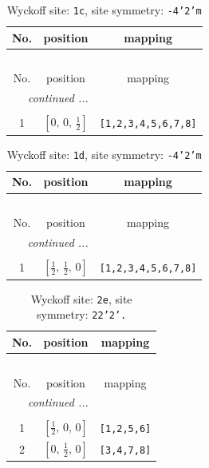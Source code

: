 \documentclass[fleqn,8pt]{jsarticle}
\begin{document}
\begin{longtable}{ccc}
\caption{Wyckoff site: {\tt 1c}, site symmetry: {\tt -4'2'm}}
 \\
 \hline \hline
No. & position & mapping \\ \hline \endfirsthead

\multicolumn{2}{l}{\tablename\ \thetable{}} \\
 \hline \hline
No. & position & mapping \\ \hline \endhead

 \hline \hline
\multicolumn{2}{r}{\footnotesize\it continued ...} \\ \endfoot

 \hline \hline
\multicolumn{2}{r}{} \\ \endlastfoot

1 & $\left[ 0,\, 0,\, \frac{1}{2} \right]$ & {\tt [1,2,3,4,5,6,7,8]} \\
\end{longtable}
\renewcommand{\arraystretch}{1.2}
\begin{longtable}{ccc}
\caption{Wyckoff site: {\tt 1d}, site symmetry: {\tt -4'2'm}}
 \\
 \hline \hline
No. & position & mapping \\ \hline \endfirsthead

\multicolumn{2}{l}{\tablename\ \thetable{}} \\
 \hline \hline
No. & position & mapping \\ \hline \endhead

 \hline \hline
\multicolumn{2}{r}{\footnotesize\it continued ...} \\ \endfoot

 \hline \hline
\multicolumn{2}{r}{} \\ \endlastfoot

1 & $\left[ \frac{1}{2},\, \frac{1}{2},\, 0 \right]$ & {\tt [1,2,3,4,5,6,7,8]} \\
\end{longtable}
\renewcommand{\arraystretch}{1.2}
\begin{longtable}{ccc}
\caption{Wyckoff site: {\tt 2e}, site symmetry: {\tt 22'2'.}}
 \\
 \hline \hline
No. & position & mapping \\ \hline \endfirsthead

\multicolumn{2}{l}{\tablename\ \thetable{}} \\
 \hline \hline
No. & position & mapping \\ \hline \endhead

 \hline \hline
\multicolumn{2}{r}{\footnotesize\it continued ...} \\ \endfoot

 \hline \hline
\multicolumn{2}{r}{} \\ \endlastfoot

1 & $\left[ \frac{1}{2},\, 0,\, 0 \right]$ & {\tt [1,2,5,6]} \\ \hline
2 & $\left[ 0,\, \frac{1}{2},\, 0 \right]$ & {\tt [3,4,7,8]} \\
\end{longtable}
\end{document}
